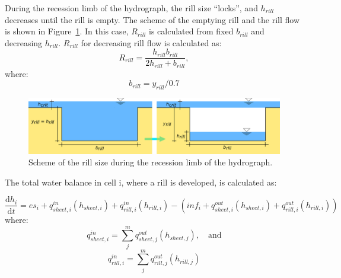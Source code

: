             During the recession limb of the hydrograph, the rill size “locks”, and
            $h_{rill}$ decreases until the rill is empty. The scheme of the emptying rill
            and the rill flow is shown in Figure~\ref{fig:rill_prazdneni}. In this case,
            $R_{rill}$ is calculated from fixed $b_{rill}$ and decreasing $h_{rill}$.
            $R_{rill}$ for decreasing rill flow is calculated as:
            \begin{equation}
                R_{rill} = \frac{h_{rill}b_{rill}}{2h_{rill}+b_{rill}},
              \label{eq:rrill2}
            \end{equation}
            where:
            \begin{equation}
              b_{rill} = y_{rill}/0.7
              \label{eq:brill2}
            \end{equation}

            \begin{figure}[t]
                \includegraphics[width=1\linewidth]{./img/rill_schema_prazdneni.png}
                \caption{Scheme of the rill size during the recession limb of the hydrograph.}
                \label{fig:rill_prazdneni}
            \end{figure}

            The total water balance in cell i, where a rill is developed, is calculated as:

            \begin{equation}
                \frac{\mathrm{d}h_i}{\mathrm{d}t} = es_i + q^{in}_{sheet,i}(h_{sheet,i})
                +q^{in}_{rill,i}(h_{rill,i}) - (inf_i + q^{out}_{sheet,i}(h_{sheet,i}) +
                q^{out}_{rill,i}(h_{rill,i}))
            \end{equation}
            where:
            \begin{equation}
                q^{in}_{sheet,i} = \sum_j^m q^{out}_{sheet, j}(h_{sheet,j}),\quad \mathrm{and}
            \end{equation}
            \begin{equation}
                q^{in}_{rill,i} = \sum_j^m q^{out}_{rill, j}(h_{rill,j})
            \end{equation}

